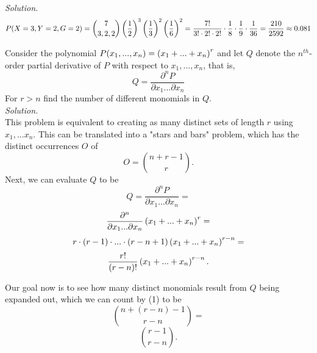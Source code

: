 \documentclass{exam}
\begin{document}
\begin{questions}
\\ \textit{Solution.} \\
$$P(X = 3, Y = 2, G = 2) = \binom{7}{3, 2, 2}\left( \frac{1}{2} \right)^3\left( \frac{1}{3} \right)^2\left( \frac{1}{6} \right)^2 = \frac{7!}{3!\cdot2!\cdot2!} \cdot \frac{1}{8} \cdot \frac{1}{9} \cdot \frac{1}{36} = \frac{210}{2592} \approx 0.081$$

\newpage
\question
Consider the polynomial $P(x_1, ..., x_n) = \left( x_1 + ... + x_n \right)^r$ and let $Q$ denote the $n^{th}$-order partial derivative of $P$ with respect to $x_1, ..., x_n$, that is,
$$Q = \frac{\partial^n P}{\partial x_1 ... \partial x_n}$$
For $r > n$ find the number of different monomials in $Q$.
\\
\textit{Solution.} \\
This problem is equivalent to creating as many distinct sets of length $r$ using $x_1, ... x_n$. This can be translated into a "stars and bars" problem, which has the distinct occurrences $O$ of
\begin{equation}
    O = \binom{n + r - 1}{r}.
\end{equation}
 Next, we can evaluate $Q$ to be
$$Q = \frac{\partial^n P}{\partial x_1 ... \partial x_n} =$$
$$\frac{\partial^n}{\partial x_1 ... \partial x_n} \left( x_1 + ... + x_n \right)^r=$$
$$r \cdot (r - 1) \cdot ... \cdot (r - n + 1) \left( x_1 + ... + x_n \right)^{r - n} =$$
$$\frac{r!}{(r - n)!} \left( x_1 + ... + x_n \right)^{r - n}.$$

Our goal now is to see how many distinct monomials result from $Q$ being expanded out, which we can count by (1) to be
$$\binom{n + (r - n) - 1}{r - n} = $$
$$\binom{r - 1}{r - n}.$$
\newpage
\end{questions}
\end{document}
